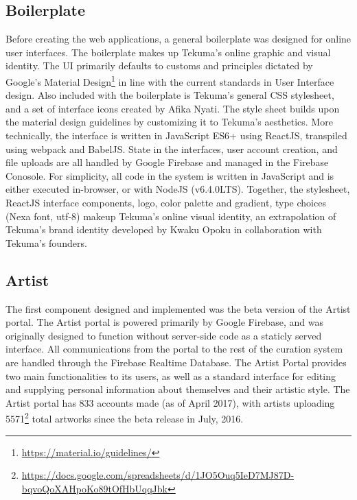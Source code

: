 \documentclass[fontsize=12pt]{scrartcl} %
\begin{document}
\subsection{Boilerplate}
Before creating the web applications, a general boilerplate was designed for online user interfaces. The boilerplate makes up Tekuma's online graphic and visual identity. The UI primarily defaults to customs and principles dictated by Google's Material Design\footnote{\url{https://material.io/guidelines/}} in line with the current standards in User Interface design. Also included with the boilerplate is Tekuma's general CSS stylesheet, and a set of interface icons created by Afika Nyati. The style sheet builds upon the material design guidelines by customizing it to Tekuma's aesthetics. More technically, the interface is written in JavaScript ES6+ using ReactJS, transpiled using webpack and BabelJS. State in the interfaces, user account creation, and file uploads are all handled by Google Firebase and managed in the Firebase Conosole. For simplicity, all code in the system is written in JavaScript and is either executed in-browser, or with NodeJS (v6.4.0LTS). Together, the stylesheet, ReactJS interface components, logo, color palette and gradient, type choices (Nexa font, utf-8) makeup Tekuma's online visual identity, an extrapolation of Tekuma's brand identity developed by Kwaku Opoku in collaboration with Tekuma's founders.


\subsection{Artist}


The first component designed and implemented was the beta version of the Artist portal. The Artist portal is powered primarily by Google Firebase, and was originally designed to function without server-side code as a staticly served interface. All communications from the portal to the rest of the curation system are handled through the Firebase Realtime Database. The Artist Portal provides two main functionalities to its users, as well as a standard interface for editing and supplying personal information about themselves and their artistic style. The Artist portal has 833 accounts made (as of April 2017), with artists uploading 5571\footnote{ \url{https://docs.google.com/spreadsheets/d/1JO5Ouq5IeD7MJ87D-bqvoQoXAHpoKo89tOfHbUqqJbk}} total artworks since the beta release in July, 2016.\\
\end{document}
